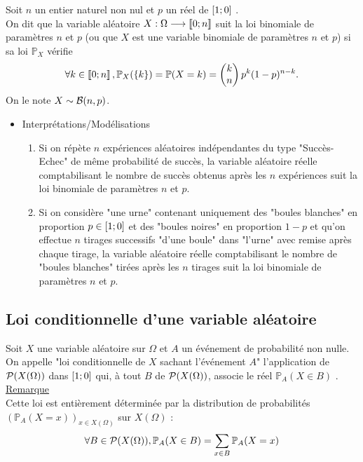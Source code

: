 \begin{defprop}
    Soit \(n\) un entier naturel non nul et \(p\) un réel de \(\intervii{1}{0}\)  . \\
    On dit que la variable aléatoire \(X : \Omega \to \interventierii{0}{n}\) suit la loi binomiale de paramètres \(n\) et \(p\) (ou que \(X\) est une variable binomiale de paramètres \(n\) et \(p\)) si sa loi \(\mathbb{P}_{X}\) vérifie
    \[\forall k \in  \interventierii{0}{n} , \mathbb{P}_{X} (\accol{k}) = \mathbb{P} (X = k) = \binom{n}{k}p^k(1 - p)^{n-k}.\]
    On le note \(X \sim \cal{B}(n, p)\).
    \begin{itemize}
    \item Interprétations/Modélisations\\
        \begin{enumerate}
            \item Si on répète \(n\) expériences aléatoires indépendantes du type "Succès-Echec" de même probabilité de succès, la variable aléatoire réelle comptabilisant le nombre de succès obtenus après les \(n\) expériences suit la loi binomiale de paramètres \(n\) et \(p\).
            \item Si on considère "une urne" contenant uniquement des "boules blanches" en proportion \(p \in  \intervii{1}{0}\) et des "boules noires" en proportion \(1 - p\) et qu’on effectue \(n\) tirages successifs "d’une boule" dans "l’urne" avec remise après chaque tirage, la variable aléatoire réelle comptabilisant le nombre de "boules blanches" tirées après les \(n\) tirages suit la loi binomiale de paramètres \(n\) et \(p\).
        \end{enumerate}
    \end{itemize}
\end{defprop}
\subsection{Loi conditionnelle d’une variable aléatoire}
\begin{defprop}
    Soit \(X\) une variable aléatoire sur \(\Omega\) et \(A\) un événement de probabilité non nulle.\\
    On appelle "loi conditionnelle de \(X\) sachant l’événement \(A\)" l’application de \(\cal{P}(X(\Omega))\) dans \(\intervii{1}{0}\) qui, à tout \(B\) de \(\cal{P} (X(\Omega))\), associe le réel \(\mathbb{P}_A (X \in  B)\) .\\
    \underline{Remarque}\\
    Cette loi est entièrement déterminée par la distribution de probabilités \((\mathbb{P}_A(X = x))_{x\in X(\Omega)}\) sur \(X(\Omega)\) :
    \[\forall B \in  \cal{P} (X(\Omega)) , \mathbb{P}_A (X \in  B) = \sum_{x\in B}\mathbb{P}_A(X = x)\]
\end{defprop}

